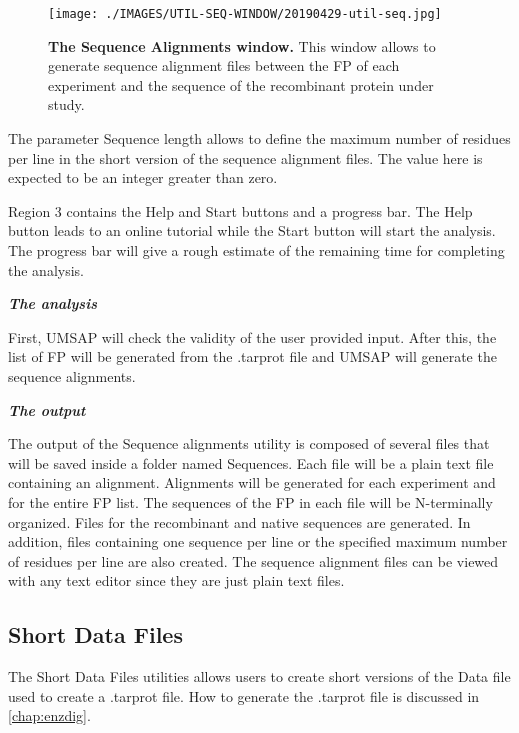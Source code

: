 \begin{figure}[h]
	\centering
	\texttt{[image: ./IMAGES/UTIL-SEQ-WINDOW/20190429-util-seq.jpg]}	    
	\caption[The Sequence Alignments window]{\textbf{The Sequence Alignments window.} This window allows to generate sequence alignment files between the FP of each experiment and the sequence of the recombinant protein under study.} 
	\label{fig:seqaliset}
	\vspace{-5pt} 	
\end{figure} 

The parameter Sequence length allows to define the maximum number of residues per line in the short version of the sequence alignment files. The value here is expected to be an integer greater than zero.

Region \num{3} contains the Help and Start buttons and a progress bar. The Help button leads to an online tutorial while the Start button will start the analysis. The progress bar will give a rough estimate of the remaining time for completing the analysis.

\textit{\textbf{The analysis}}

First, UMSAP will check the validity of the user provided input. After this, the list of FP will be generated from the .tarprot file and UMSAP will generate the sequence alignments.

\textit{\textbf{The output}}

The output of the Sequence alignments utility is composed of several files that will be saved inside a folder named Sequences. Each file will be a plain text file containing an alignment. Alignments will be generated for each experiment and for the entire FP list. The sequences of the FP in each file will be N-terminally organized. Files for the recombinant and native sequences are generated. In addition, files containing one sequence per line or the specified maximum number of residues per line are also created. The sequence alignment files can be viewed with any text editor since they are just plain text files.

\subsection{Short Data Files}
\label{subsec:shortDF}

The Short Data Files utilities allows users to create short versions of the Data file used to create a .tarprot file. How to generate the .tarprot file is discussed in \autoref{chap:enzdig}.

